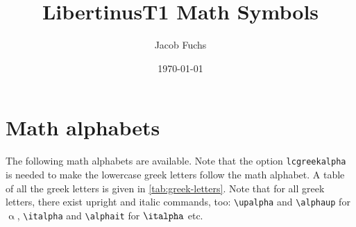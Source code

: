 \documentclass[captions=tableheading]{scrartcl}
\title{LibertinusT1 Math Symbols}
\author{Jacob Fuchs}
\date{\today}
\begin{document}
\maketitle

\section{Math alphabets}

The following math alphabets are available.
Note that the option \verb|lcgreekalpha| is needed to make the lowercase
greek letters follow the math alphabet.
A table of all the greek letters is given in \cref{tab:greek-letters}.
Note that for all greek letters, there exist upright and italic
commands, too: \verb|\upalpha| and \verb|\alphaup| for $\upalpha$,
\verb|\italpha| and \verb|\alphait| for $\italpha$ etc.
\end{document}
